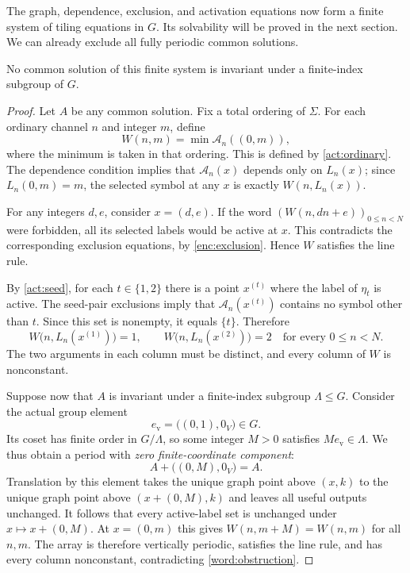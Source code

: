 The graph, dependence, exclusion, and activation equations now form a
finite system of tiling equations in $G$.  Its solvability will be
proved in the next section.  We can already exclude all fully periodic
common solutions.

\begin{proposition}
\label{act:nonperiodic}
No common solution of this finite system is invariant under a
finite-index subgroup of $G$.
\end{proposition}

\begin{proof}
Let $A$ be any common solution.  Fix a total ordering of $\Sigma$.
For each ordinary channel $n$ and integer $m$, define
\[
 W(n,m)=\min\mathcal A_n((0,m)),
\]
where the minimum is taken in that ordering.  This is defined by
\cref{act:ordinary}.  The dependence condition implies that
$\mathcal A_n(x)$ depends only on $L_n(x)$; since $L_n(0,m)=m$, the
selected symbol at any $x$ is exactly $W(n,L_n(x))$.

For any integers $d,e$, consider $x=(d,e)$.  If the word
$(W(n,dn+e))_{0\le n<N}$ were forbidden, all its selected labels
would be active at $x$.  This contradicts the corresponding exclusion
equations, by \cref{enc:exclusion}.  Hence $W$ satisfies the line rule.

By \cref{act:seed}, for each $t\in\{1,2\}$ there is a point
$x^{(t)}$ where the label of $\eta_t$ is active.  The seed-pair
exclusions imply that $\mathcal A_n(x^{(t)})$ contains no symbol other
than $t$.  Since this set is nonempty, it equals $\{t\}$.  Therefore
\[
 W\bigl(n,L_n(x^{(1)})\bigr)=1,
 \qquad
 W\bigl(n,L_n(x^{(2)})\bigr)=2
 \quad\text{for every }0\le n<N.
\]
The two arguments in each column must be distinct, and every column
of $W$ is nonconstant.

Suppose now that $A$ is invariant under a finite-index subgroup
$\Lambda\le G$.  Consider the actual group element
\[
 e_{\mathrm v}=\bigl((0,1),0_V\bigr)\in G.
\]
Its coset has finite order in $G/\Lambda$, so some integer $M>0$
satisfies $M e_{\mathrm v}\in\Lambda$.  We thus obtain a period
with \emph{zero finite-coordinate component}:
\[
 A+\bigl((0,M),0_V\bigr)=A.
\]
Translation by this element takes the unique graph point above
$(x,k)$ to the unique graph point above $(x+(0,M),k)$ and leaves all
useful outputs unchanged.  It follows that every active-label set is
unchanged under $x\mapsto x+(0,M)$.  At $x=(0,m)$ this gives
$W(n,m+M)=W(n,m)$ for all $n,m$.
The array is therefore vertically periodic, satisfies the line rule,
and has every column nonconstant, contradicting
\cref{word:obstruction}.
\end{proof}
